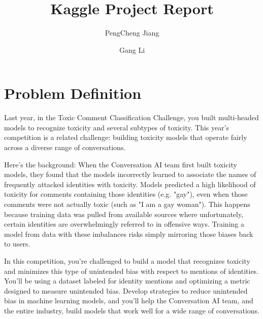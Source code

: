 \documentclass{amsart}
\begin{document}
%
%
\title[Learning Process]{Kaggle Project Report}%

\author{PengCheng Jiang}
\address[A.~1]{School of Computer Science,\\ 
JiLin University, jilin 130000, China}%

\author{Gang Li}
\address[A.~2]{School of Information Technology \\
Deakin University, Geelong, VIC 3216, Australia}%



%
\date{\gitAuthorDate}%




\maketitle
\tableofcontents

\newpage

\section{Problem Definition}
Last year, in the Toxic Comment Classification Challenge, you built multi-headed models to recognize toxicity and several subtypes of toxicity. This year's competition is a related challenge: building toxicity models that operate fairly across a diverse range of conversations.

Here’s the background: When the Conversation AI team first built toxicity models, they found that the models incorrectly learned to associate the names of frequently attacked identities with toxicity. Models predicted a high likelihood of toxicity for comments containing those identities (e.g. "gay"), even when those comments were not actually toxic (such as "I am a gay woman"). This happens because training data was pulled from available sources where unfortunately, certain identities are overwhelmingly referred to in offensive ways. Training a model from data with these imbalances risks simply mirroring those biases back to users.

In this competition, you're challenged to build a model that recognizes toxicity and minimizes this type of unintended bias with respect to mentions of identities. You'll be using a dataset labeled for identity mentions and optimizing a metric designed to measure unintended bias. Develop strategies to reduce unintended bias in machine learning models, and you'll help the Conversation AI team, and the entire industry, build models that work well for a wide range of conversations.
\end{document}
